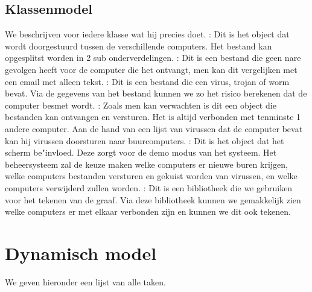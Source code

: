 \documentclass[a4paper,oneside]{report}
\begin{document}
\subsection{Klassenmodel}
We beschrijven voor iedere klasse wat hij precies doet.
: Dit is het object dat wordt doorgestuurd tussen de verschillende computers. Het bestand kan opgesplitst worden in 2 sub onderverdelingen.
: Dit is een bestand die geen nare gevolgen heeft voor de computer die het ontvangt, men kan dit vergelijken met een email met alleen tekst.
: Dit is een bestand die een virus, trojan of worm bevat. Via de gegevens  van het bestand kunnen we zo het risico berekenen dat de computer besmet wordt.
: Zoals men kan verwachten is dit een object die bestanden kan ontvangen en versturen. Het is altijd verbonden met tenminste 1 andere computer. Aan de hand van een lijst van virussen dat de computer bevat kan hij virussen doorsturen naar buurcomputers.
: Dit is het object dat het scherm be"invloed. Deze zorgt voor de demo modus van het systeem. Het beheersysteem zal de keuze maken welke computers er nieuwe buren krijgen, welke computers bestanden versturen en gekuist worden van virussen, en welke computers verwijderd zullen worden.
: Dit is een bibliotheek die we gebruiken voor het tekenen van de graaf. Via deze bibliotheek kunnen we gemakkelijk zien welke computers er met elkaar verbonden zijn en kunnen we dit ook tekenen.

\eindlemma
{}
\newpage
{}
\newpage
\section{Dynamisch model}
We geven hieronder een lijst van alle taken.
\end{document}
